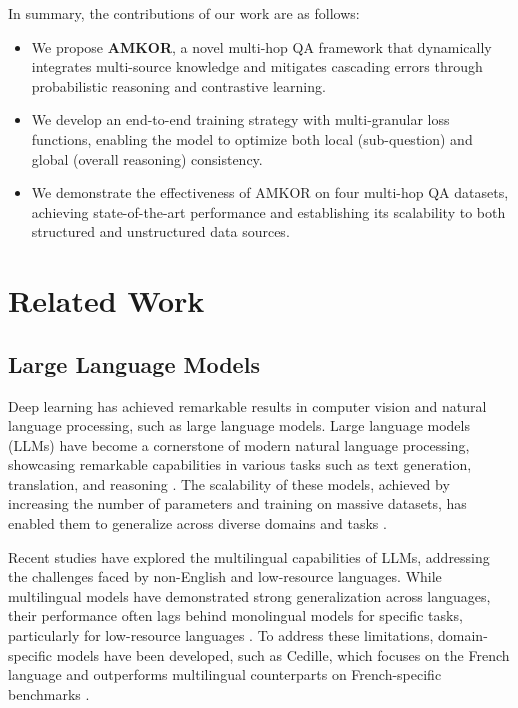In summary, the contributions of our work are as follows:
\begin{itemize}
    \item We propose \textbf{AMKOR}, a novel multi-hop QA framework that dynamically integrates multi-source knowledge and mitigates cascading errors through probabilistic reasoning and contrastive learning.
    \item We develop an end-to-end training strategy with multi-granular loss functions, enabling the model to optimize both local (sub-question) and global (overall reasoning) consistency.
    \item We demonstrate the effectiveness of AMKOR on four multi-hop QA datasets, achieving state-of-the-art performance and establishing its scalability to both structured and unstructured data sources.
\end{itemize}



\section{Related Work}

\subsection{Large Language Models}
Deep learning has achieved remarkable results in computer vision \cite{wang2024insectmamba} and natural language processing, such as large language models.
Large language models (LLMs) have become a cornerstone of modern natural language processing, showcasing remarkable capabilities in various tasks such as text generation, translation, and reasoning \cite{zhou2022claret}. The scalability of these models, achieved by increasing the number of parameters and training on massive datasets, has enabled them to generalize across diverse domains and tasks \cite{nicholas2023lost,zhou2024rethinking,muller2022cedille,zhou2025training}.

Recent studies have explored the multilingual capabilities of LLMs, addressing the challenges faced by non-English and low-resource languages. While multilingual models have demonstrated strong generalization across languages, their performance often lags behind monolingual models for specific tasks, particularly for low-resource languages \cite{chang2024goldfish,ojo2023african}. To address these limitations, domain-specific models have been developed, such as Cedille, which focuses on the French language and outperforms multilingual counterparts on French-specific benchmarks \cite{muller2022cedille}.

